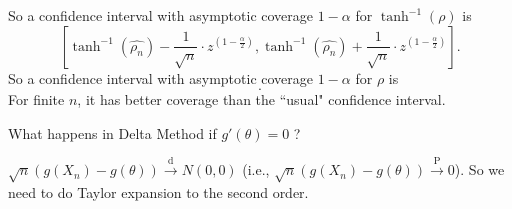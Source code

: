 \documentclass[a4paper]{article}
\begin{document}
\begin{eg}
\begin{equation}
	\end{equation}
	So a confidence interval with asymptotic coverage $1-\alpha$ for $\tanh^{-1}(\rho)$ is
	\begin{equation}
		\left[\tanh^{-1}(\hat{\rho_n}) - \frac{1}{\sqrt{n}} \cdot z^{(1-\frac{\alpha}{2})},\tanh^{-1}(\hat{\rho_n}) + \frac{1}{\sqrt{n}} \cdot z^{(1-\frac{\alpha}{2})}\right].
	\end{equation}
	So a confidence interval with asymptotic coverage $1-\alpha$ for $\rho$ is
	\begin{equation}
		[\tanh(\tanh^{-1}(\hat{\rho_n}) - \frac{1}{\sqrt{n}} \cdot z^{(1-\frac{\alpha}{2})}), \tanh(\tanh^{-1}(\hat{\rho_n}) + \frac{1}{\sqrt{n}} \cdot z^{(1-\frac{\alpha}{2})})].
	\end{equation}
	For finite $n$, it has better coverage than the ``usual" confidence interval.
\end{eg}

\begin{question}
	What happens in Delta Method if $g'(\theta) = 0$ ? 
\end{question}

\begin{answer}
	$\sqrt{n}(g(X_n)-g(\theta)) \stackrel{\text{d}}{\longrightarrow} N(0,0)$ (i.e., $\sqrt{n}(g(X_n)-g(\theta)) \stackrel{\text{P}}{\longrightarrow} 0$). So we need to do Taylor expansion to the second order.
\end{answer}
\end{document}
